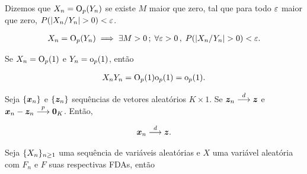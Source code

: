 \documentclass[11pt, oneside, a4paper, article]{article}
\numberwithin{equation}{section}
\begin{document}
\begin{description}
\begin{defn}
\citet[Def 3.4, p.36]{wool-2010}

Dizemos que
$X_{n} = \text{O}_{p}(Y_{n})$ se existe $M$ maior que zero, tal que para todo $\varepsilon$ maior que zero, $P( | X_{n}/Y_{n} | > 0) < \varepsilon$.

\vspace{-1 em}
\begin{align*}
X_{n} = \text{O}_{p}(Y_{n}) \implies \exists M > 0 \, ; \;
\forall \varepsilon > 0 \, , \;
P( | X_{n}/Y_{n} | > 0) < \varepsilon.
\end{align*}
\end{defn}

\begin{lem}
\citet[Lemma 3.2, p.36]{wool-2010}

Se
$X_{n} = \text{O}_{p}(1)$ e $Y_{n} = \text{o}_{p}(1)$, então

\vspace{-1 em}
\begin{align*}
	X_{n} Y_{n} = \text{O}_{p}(1) \text{o}_{p}(1) = \text{o}_{p}(1).
\end{align*}
\end{lem}

\begin{lem} \label{lem:equiv:assin}
\citet[Lemma 3.7, p.39]{wool-2010}

Seja
$\{\boldsymbol{x}_{n}\}$ e $\{\boldsymbol{z}_{n}\}$
sequências de vetores aleatórios $K \times 1$.
Se $\boldsymbol{z}_{n}  \overset{d}{\longrightarrow}  \boldsymbol{z}$ e 
$\boldsymbol{x}_{n} - \boldsymbol{z}_{n}  \overset{p}{\longrightarrow}  \boldsymbol{0}_{K}$.
Então, 

\vspace{-1 em}
\begin{align*}
\boldsymbol{x}_{n}  \overset{d}{\longrightarrow}  \boldsymbol{z}.
\end{align*}

\end{lem}

\begin{defn}
\citet[Def 3.6, p.38]{wool-2010}

Seja
$\{X_{n}\}_{n \geq 1}$  uma sequência de variáveis aleatórias e $X$ uma variável aleatória com $F_{n}$ e $F$ suas respectivas FDAs, então


\end{defn}
\end{description}
\end{document}
